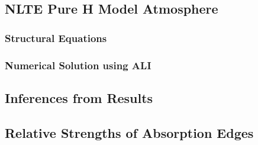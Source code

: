     	\subsection{NLTE Pure H Model Atmosphere} \label{multi-obs:discussion:nlte-pureH}
    	
    		\subsubsection{Structural Equations}
    		
    		\subsubsection{Numerical Solution using ALI}
    	
    	\subsection{Inferences from Results} \label{multi-obs:discussion:inference}
    	
    	\subsection{Relative Strengths of Absorption Edges} \label{multi-obs:discussion:abs-edge-strength}